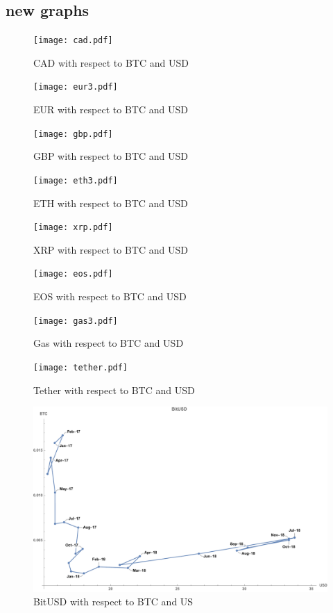 \subsection{new graphs}
\begin{figure}[!htb]
	\texttt{[image: cad.pdf]}
	\caption{CAD with respect to BTC and USD}\label{fig:cad1}
	\endminipage\hfill
	\texttt{[image: eur3.pdf]}
	\caption{EUR with respect to BTC and USD}\label{fig:eur1}
	\endminipage\hfill
	\texttt{[image: gbp.pdf]}
	\caption{GBP with respect to BTC and USD}\label{fig:gbp1}
	\endminipage
\end{figure}

\begin{figure}[!htb]
	\texttt{[image: eth3.pdf]}
	\caption{ETH with respect to BTC and USD}\label{fig:cad1}
	\endminipage\hfill
	\texttt{[image: xrp.pdf]}
	\caption{XRP with respect to BTC and USD}\label{fig:eur1}
	\endminipage\hfill
	\texttt{[image: eos.pdf]}
	\caption{EOS with respect to BTC and USD}\label{fig:gbp1}
	\endminipage
\end{figure}

\begin{figure}[!htb]
	\texttt{[image: gas3.pdf]}
	\caption{Gas with respect to BTC and USD}\label{fig:cad1}
	\endminipage\hfill
	\texttt{[image: tether.pdf]}
	\caption{Tether with respect to BTC and USD}\label{fig:eur1}
	\endminipage\hfill
	\includegraphics[width=\linewidth]{figures/BitUSD_labled.pdf}
	\caption{BitUSD with respect to BTC and US}\label{fig:bitusd1}
	\endminipage\hfill
\end{figure}


